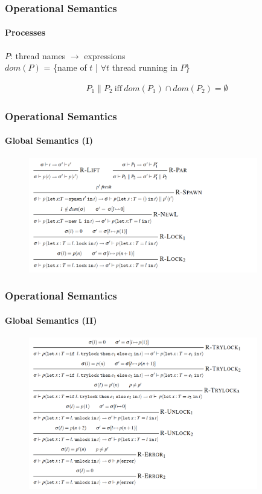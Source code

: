\begin{frame}
\frametitle{Operational Semantics}
\framesubtitle{Processes}

\begin{center}
$P$: thread names $\longrightarrow$ expressions \\
$dom(P)$ = \{name of $t$ | $\forall t$ thread running in $P$\}
\end{center}
\begin{align}
P_1 \| P_2 ~\text{iff}~ dom(P_1) \cap dom(P_2) = \emptyset
\end{align}
\end{frame}

\begin{frame}
\frametitle{Operational Semantics}
\framesubtitle{Global Semantics (I)}
\begin{figure}[h]
    \includegraphics[width=10cm]{figures/global_a.png}
    \label{fig::global_a::semantics}
\end{figure}
\end{frame}


\begin{frame}
\frametitle{Operational Semantics}
\framesubtitle{Global Semantics (II)}
\begin{figure}[h]
    \includegraphics[width=10cm]{figures/global_b.png}
    \label{fig::global_a::semantics}
\end{figure}
\end{frame}